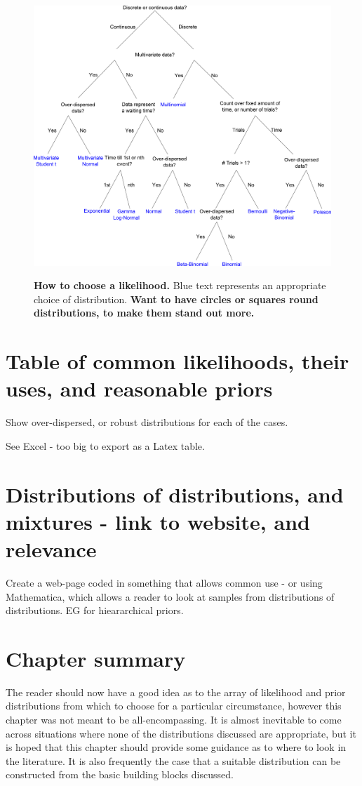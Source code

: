\documentclass[11pt,fullpage]{book}
\begin{document}
\begin{figure}
\centering
\scalebox{0.3} 
{\includegraphics{Distributions_likelihoodTree.pdf}}
\caption{\textbf{How to choose a likelihood.} Blue text represents an appropriate choice of distribution. \textbf{Want to have circles or squares round distributions, to make them stand out more.}}\label{fig:Distributions_likelihoodTree}
\end{figure}


\section{Table of common likelihoods, their uses, and reasonable priors}\label{sec:Distributions_table}
Show over-dispersed, or robust distributions for each of the cases.

See Excel - too big to export as a Latex table.

\section{Distributions of distributions, and mixtures - link to website, and relevance}
Create a web-page coded in something that allows common use - or using Mathematica, which allows a reader to look at samples from distributions of distributions. EG for hieararchical priors.

\section{Chapter summary}
The reader should now have a good idea as to the array of likelihood and prior distributions from which to choose for a particular circumstance, however this chapter was not meant to be all-encompassing. It is almost inevitable to come across situations where none of the distributions discussed are appropriate, but it is hoped that this chapter should provide some guidance as to where to look in the literature. It is also frequently the case that a suitable distribution can be constructed from the basic building blocks discussed.
\end{document}
